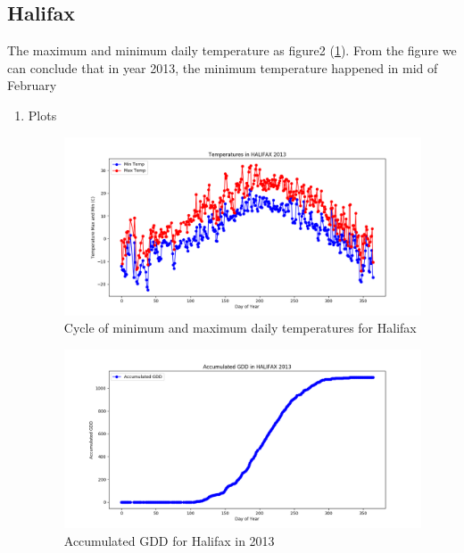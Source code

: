 \documentclass{article}
\begin{document}
\subsection{ \bf Halifax }

The maximum and minimum daily temperature as figure2 (\ref{2}). From the figure we can conclude that in year 2013, the minimum temperature happened in mid of February 
\begin{enumerate}

\item  Plots 

\begin{center}
\begin{figure}[H]
\includegraphics[width=5.25in]{Plot/HALIFAX/day_vs_temp_2013.png}



\caption{Cycle of minimum and maximum daily temperatures for Halifax}
\label{2}
\end{figure}
\end{center}


\begin{figure}[H]
\includegraphics[width=5.25in]{Plot/halifax.png}



\caption{Accumulated GDD for Halifax in 2013}
\label{2.2}
\end{figure}
\end{enumerate}
\end{document}
